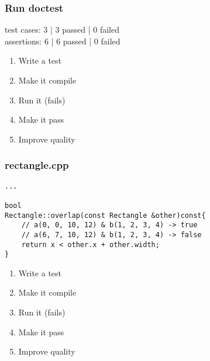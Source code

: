 \begin{frame}[fragile]
\frametitle{Run doctest}
\begin{minipage}[t]{0.48\linewidth}
test cases: 3 | 3 passed | 0 failed\\
assertions: 6 | 6 passed | 0 failed\\
\end{minipage}\hfill
\begin{minipage}[t]{0.28\linewidth}
  \small
  \begin{enumerate} 
    \item \textcolor{deadcolor}{Write a test}
    \item \textcolor{deadcolor}{Make it compile}
    \item \textcolor{deadcolor}{Run it (fails)}
    \item \textcolor{activecolor}{Make it pass}
    \item \textcolor{deadcolor}{Improve quality}
  \end{enumerate} 
\end{minipage}
\end{frame}


\begin{frame}[fragile]
\frametitle{rectangle.cpp}
\begin{minipage}[t]{0.48\linewidth}
\begin{lstlisting}
...

bool 
Rectangle::overlap(const Rectangle &other)const{
    // a(0, 0, 10, 12) & b(1, 2, 3, 4) -> true
    // a(6, 7, 10, 12) & b(1, 2, 3, 4) -> false
    return x < other.x + other.width;
}
\end{lstlisting}
\end{minipage}\hfill
\begin{minipage}[t]{0.28\linewidth}
  \small
  \begin{enumerate} 
    \item \textcolor{deadcolor}{Write a test}
    \item \textcolor{deadcolor}{Make it compile}
    \item \textcolor{deadcolor}{Run it (fails)}
    \item \textcolor{deadcolor}{Make it pass}
    \item \textcolor{activecolor}{Improve quality}
  \end{enumerate} 
\end{minipage}
\end{frame}


